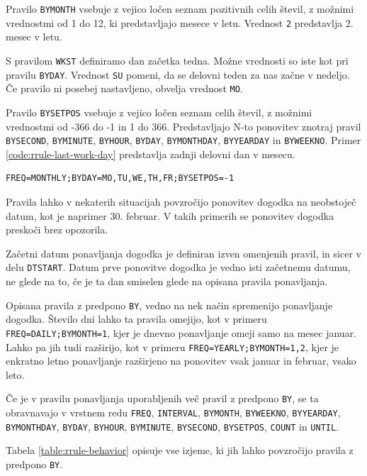 Pravilo \texttt{BYMONTH} vsebuje z vejico ločen seznam pozitivnih celih števil, z možnimi vrednostmi od 1 do 12, ki predstavljajo mesece v letu. Vrednost \texttt{2} predstavlja 2. mesec v letu.

S pravilom \texttt{WKST} definiramo dan začetka tedna. Možne vrednosti so iste kot pri pravilu \texttt{BYDAY}. Vrednost \texttt{SU} pomeni, da se delovni teden za nas začne v nedeljo. Če pravilo ni posebej nastavljeno, obvelja vrednost \texttt{MO}.

Pravilo \texttt{BYSETPOS} vsebuje z vejico ločen seznam celih števil, z možnimi vrednostmi od -366 do -1 in 1 do 366. Predstavljajo N-to ponovitev znotraj pravil \texttt{BYSECOND}, \texttt{BYMINUTE}, \texttt{BYHOUR}, \texttt{BYDAY}, \texttt{BYMONTHDAY}, \texttt{BYYEARDAY} in \texttt{BYWEEKNO}. Primer \ref{code:rrule-last-work-day} predstavlja zadnji delovni dan v mesecu.

\begin{lstlisting}[caption=Primer uporabe pravila za zadnji delovni dan v mesecu., label=code:rrule-last-work-day]
FREQ=MONTHLY;BYDAY=MO,TU,WE,TH,FR;BYSETPOS=-1
\end{lstlisting}

Pravila lahko v nekaterih situacijah povzročijo ponovitev dogodka na neobstoječ datum, kot je naprimer 30. februar. V takih primerih se ponovitev dogodka preskoči brez opozorila.

Začetni datum ponavljanja dogodka je definiran izven omenjenih pravil, in sicer v delu \texttt{DTSTART}. Datum prve ponovitve dogodka je vedno isti začetnemu datumu, ne glede na to, če je ta dan smiselen glede na opisana pravila ponavljanja.

Opisana pravila z predpono \texttt{BY}, vedno na nek način spremenijo ponavljanje dogodka. Število dni lahko ta pravila omejijo, kot v primeru \texttt{FREQ=DAILY;BYMONTH=1}, kjer je dnevno ponavljanje omeji samo na mesec januar. Lahko pa jih tudi razširijo, kot v primeru \texttt{FREQ=YEARLY;BYMONTH=1,2}, kjer je enkratno letno ponavljanje razširjeno na ponovitev vsak januar in februar, vsako leto.

Če je v pravilu ponavljanja uporabljenih več pravil z predpono \texttt{BY}, se ta obravnavajo v vrstnem redu \texttt{FREQ}, \texttt{INTERVAL}, \texttt{BYMONTH}, \texttt{BYWEEKNO}, \texttt{BYYEARDAY}, \texttt{BYMONTHDAY}, \texttt{BYDAY}, \texttt{BYHOUR}, \texttt{BYMINUTE}, \texttt{BYSECOND}, \texttt{BYSETPOS}, \texttt{COUNT} in \texttt{UNTIL}.

Tabela \ref{table:rrule-behavior} opisuje vse izjeme, ki jih lahko povzročijo pravila z predpono \texttt{BY}.

